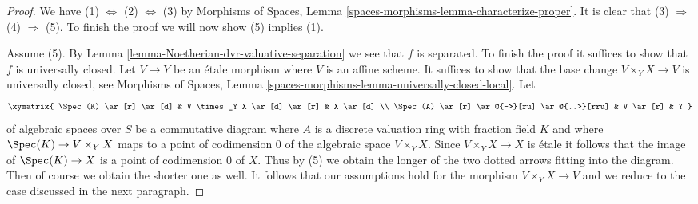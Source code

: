 \begin{proof}
We have (1) $\Leftrightarrow$ (2) $\Leftrightarrow$ (3) by 
Morphisms of Spaces, Lemma \ref{spaces-morphisms-lemma-characterize-proper}.
It is clear that (3) $\Rightarrow$ (4) $\Rightarrow$ (5).
To finish the proof we will now show (5) implies (1).

\medskip\noindent
Assume (5). By Lemma \ref{lemma-Noetherian-dvr-valuative-separation}
we see that $f$ is separated. To finish the proof it suffices to show
that $f$ is universally closed. Let $V \to Y$ be an \'etale morphism
where $V$ is an affine scheme. It suffices to show that the base
change $V \times_Y X \to V$ is universally closed, see
Morphisms of Spaces, Lemma
\ref{spaces-morphisms-lemma-universally-closed-local}.
Let
$$
\xymatrix{
\Spec(K) \ar[r] \ar[d] & V \times_Y X \ar[d] \ar[r] & X \ar[d] \\
\Spec(A) \ar[r] \ar@{-->}[ru] \ar@{..>}[rru] & V \ar[r] & Y
}
$$
of algebraic spaces over $S$
be a commutative diagram where $A$ is a discrete valuation ring
with fraction field $K$ and where $\Spec(K) \to V \times_Y X$
maps to a point of codimension $0$ of the algebraic space
$V \times_Y X$. Since $V \times_Y X \to X$ is \'etale it follows
that the image of $\Spec(K) \to X$ is a point of codimension $0$
of $X$. Thus by (5) we obtain the longer of the two dotted
arrows fitting into the diagram. Then of course we obtain the
shorter one as well. It follows that our assumptions hold for
the morphism $V \times_Y X \to V$ and we reduce to the case discussed
in the next paragraph.


\end{proof}
